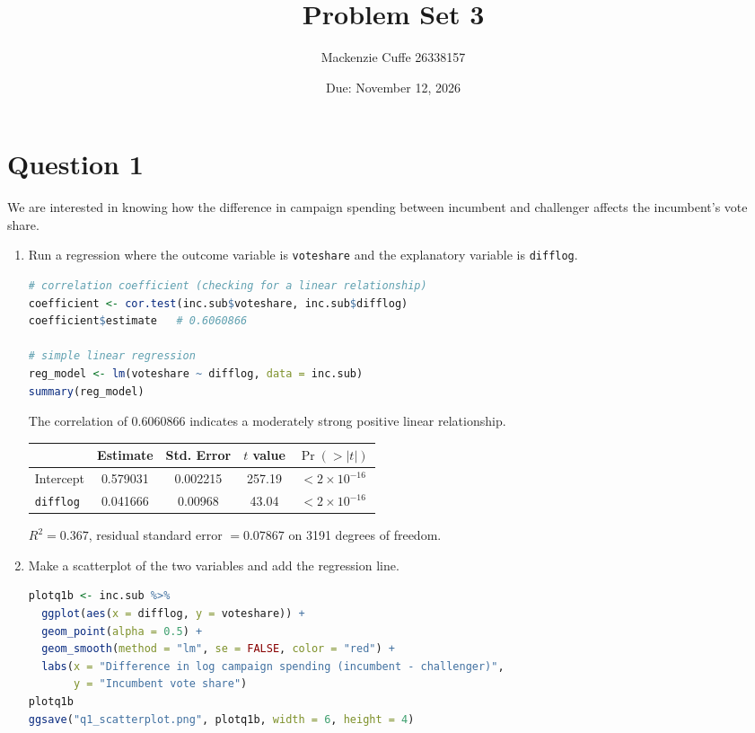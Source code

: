 \documentclass[12pt,letterpaper]{article}
\title{Problem Set 3}
\date{Due: November 12, 2026}
\author{Mackenzie Cuffe 26338157}
\begin{document}
	\maketitle


		\vspace{.25cm}
	


	\vspace{.5cm}
\section*{Question 1}
\vspace{.25cm}
\noindent We are interested in knowing how the difference in campaign spending between incumbent and challenger affects the incumbent's vote share.
\begin{enumerate}

  \item Run a regression where the outcome variable is \texttt{voteshare} and the explanatory variable is \texttt{difflog}.

\begin{lstlisting}[language=R]
# correlation coefficient (checking for a linear relationship)
coefficient <- cor.test(inc.sub$voteshare, inc.sub$difflog)
coefficient$estimate   # 0.6060866

# simple linear regression
reg_model <- lm(voteshare ~ difflog, data = inc.sub)
summary(reg_model)
\end{lstlisting}

  The correlation of 0.6060866 indicates a moderately strong positive linear relationship.

  \begin{center}
  \begin{tabular}{lcccc}
    \hline
    & Estimate & Std. Error & $t$ value & $\Pr(>|t|)$ \\
    \hline
    Intercept & 0.579031 & 0.002215 & 257.19 & $<2\times10^{-16}$ \\
    \texttt{difflog} & 0.041666 & 0.00968 & 43.04 & $<2\times10^{-16}$ \\
    \hline
  \end{tabular}
  \end{center}
  \noindent $R^2 = 0.367$, residual standard error $= 0.07867$ on 3191 degrees of freedom.

  \item Make a scatterplot of the two variables and add the regression line.

\begin{lstlisting}[language=R]
plotq1b <- inc.sub %>%
  ggplot(aes(x = difflog, y = voteshare)) +
  geom_point(alpha = 0.5) +
  geom_smooth(method = "lm", se = FALSE, color = "red") +
  labs(x = "Difference in log campaign spending (incumbent - challenger)",
       y = "Incumbent vote share")
plotq1b
ggsave("q1_scatterplot.png", plotq1b, width = 6, height = 4)
\end{lstlisting}


\end{enumerate}
\end{document}
